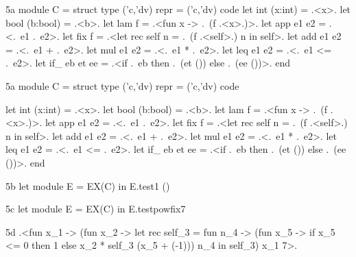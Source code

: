 \ifshort
\begin{SaveVerbatim}{5a}
module C = struct type ('c,'dv) repr = ('c,'dv) code
  let int (x:int)  = .<x>.            let bool (b:bool) = .<b>.
  let lam f        = .<fun x -> .~(f .<x>.)>.
  let app e1 e2    = .<.~e1 .~e2>.
  let fix f =  .<let rec self n = .~(f .<self>.) n in self>.
  let add e1 e2    = .<.~e1 + .~e2>.  let mul e1 e2 = .<.~e1 * .~e2>.
  let leq e1 e2    = .<.~e1 <= .~e2>.
  let if_ eb et ee = .<if .~eb then .~(et ()) else .~(ee ())>. end
\end{SaveVerbatim}
\else
\begin{SaveVerbatim}{5a}
module C = struct
  type ('c,'dv) repr = ('c,'dv) code

  let int (x:int)   = .<x>.
  let bool (b:bool) = .<b>.
  let lam f         = .<fun x -> .~(f .<x>.)>.
  let app e1 e2     = .<.~e1 .~e2>.
  let fix f         = .<let rec self n = .~(f .<self>.) n in self>.
  let add e1 e2     = .<.~e1 + .~e2>.
  let mul e1 e2     = .<.~e1 * .~e2>.
  let leq e1 e2     = .<.~e1 <= .~e2>.
  let if_ eb et ee  = .<if .~eb then .~(et ()) else .~(ee ())>.
end
\end{SaveVerbatim}
\fi
\begin{SaveVerbatim}{5b}
let module E = EX(C) in E.test1 ()
\end{SaveVerbatim}
\begin{SaveVerbatim}{5c}
let module E = EX(C) in E.testpowfix7
\end{SaveVerbatim}
\begin{SaveVerbatim}{5d}
.<fun x_1 -> (fun x_2 -> let rec self_3 = fun n_4 ->
   (fun x_5 -> if x_5 <= 0 then 1 else x_2 * self_3 (x_5 + (-1)))
   n_4 in self_3) x_1 7>.
\end{SaveVerbatim}

